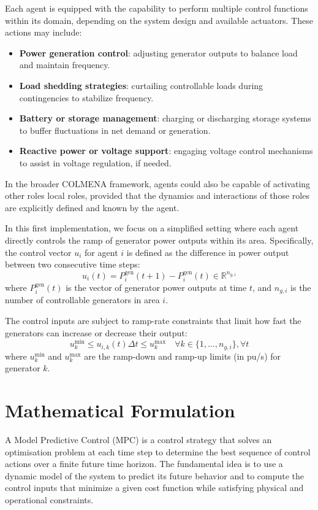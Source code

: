 \documentclass{article}
\begin{document}
Each agent is equipped with the capability to perform multiple control functions within its domain, depending on the system design and available actuators. These actions may include:
\begin{itemize}
    \item \textbf{Power generation control}: adjusting generator outputs to balance load and maintain frequency.
    \item \textbf{Load shedding strategies}: curtailing controllable loads during contingencies to stabilize frequency.
    \item \textbf{Battery or storage management}: charging or discharging storage systems to buffer fluctuations in net demand or generation.
    \item \textbf{Reactive power or voltage support}: engaging voltage control mechanisms to assist in voltage regulation, if needed.
\end{itemize}

In the broader COLMENA framework, agents could also be capable of activating other roles local roles, provided that the dynamics and interactions of those roles are explicitly defined and known by the agent.

In this first implementation, we focus on a simplified setting where each agent directly controls the ramp of generator power outputs within its area. Specifically, the control vector \( u_i \) for agent \( i \) is defined as the difference in power output between two consecutive time steps:
\begin{equation}
    u_i(t) = P^{\text{gen}}_i(t+1) - P^{\text{gen}}_i(t) \in \mathbb{R}^{n_{g,i}}
\end{equation}
where \( P^{\text{gen}}_i(t) \) is the vector of generator power outputs at time \( t \), and \( n_{g,i} \) is the number of controllable generators in area \( i \).

The control inputs are subject to ramp-rate constraints that limit how fast the generators can increase or decrease their output:
\begin{equation}
    u^{\min}_{k} \leq u_{i,k}(t)  \Delta  t \leq u^{\max}_{k} \quad \forall k \in \{1, \dots, n_{g,i}\}, \forall t
\end{equation}
where \( u^{\min}_{k} \) and \( u^{\max}_{k} \) are the ramp-down and ramp-up limits (in pu/s) for generator \( k \). 

\newpage
\section{Mathematical Formulation}
A Model Predictive Control (MPC) is a control strategy that solves an optimisation problem at each time step to determine the best sequence of control actions over a finite future time horizon. The fundamental idea is to use a dynamic model of the system to predict its future behavior and to compute the control inputs that minimize a given cost function while satisfying physical and operational constraints.
\end{document}
